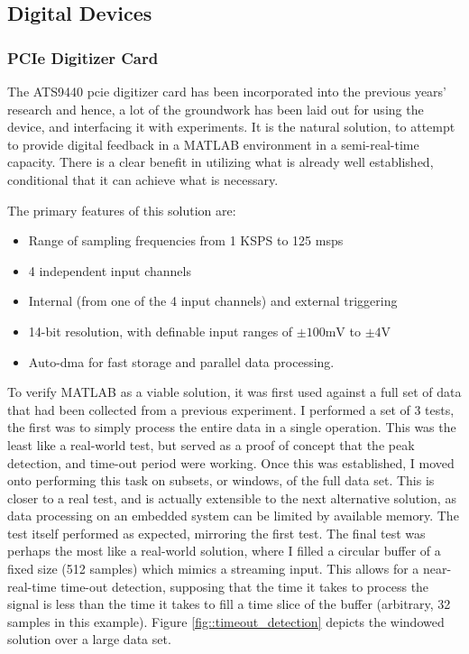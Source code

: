 \subsection{Digital Devices}
\subsubsection{PCIe Digitizer Card}
The ATS9440 \gls{pcie} digitizer card \cite{ATS9440} has been incorporated into the previous years' research and hence, a lot of the groundwork has been laid out for using the device, and interfacing it with experiments. It is the natural solution, to attempt to provide digital feedback in a MATLAB environment in a semi-real-time capacity. There is a clear benefit in utilizing what is already well established, conditional that it can achieve what is necessary.

The primary features of this solution are:
\begin{itemize}
	\item Range of sampling frequencies from 1 KSPS to 125 \gls{msps}
	\item 4 independent input channels
	\item Internal (from one of the 4 input channels) and external triggering
	\item 14-bit resolution, with definable input ranges of $\pm 100 \textrm{mV}$ to $\pm 4 \textrm{V}$
	\item Auto-\gls{dma} for fast storage and parallel data processing.
\end{itemize}

To verify MATLAB as a viable solution, it was first used against a full set of data that had been collected from a previous experiment. I performed a set of 3 tests, the first was to simply process the entire data in a single operation. This was the least like a real-world test, but served as a proof of concept that the peak detection, and time-out period were working. Once this was established, I moved onto performing this task on subsets, or windows, of the full data set. This is closer to a real test, and is actually extensible to the next alternative solution, as data processing on an embedded system can be limited by available memory. The test itself performed as expected, mirroring the first test. The final test was perhaps the most like a real-world solution, where I filled a circular buffer of a fixed size (512 samples) which mimics a streaming input. This allows for a near-real-time time-out detection, supposing that the time it takes to process the signal is less than the time it takes to fill a time slice of the buffer (arbitrary, 32 samples in this example). Figure \ref{fig::timeout_detection} depicts the windowed solution over a large data set.

